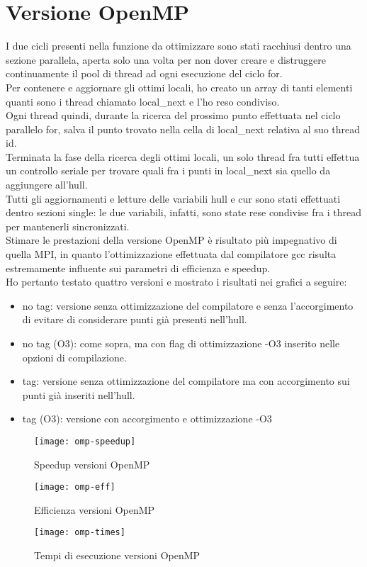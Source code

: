 \documentclass[a4paper, 12pt]{article}
\begin{document}
    \section*{Versione OpenMP}
    I due cicli presenti nella funzione da ottimizzare sono stati racchiusi dentro una sezione parallela, aperta solo una volta per non dover creare e distruggere 
    continuamente il pool di thread ad ogni esecuzione del ciclo for. \\
    Per contenere e aggiornare gli ottimi locali, ho creato un array di tanti elementi quanti sono i thread chiamato local_next e l’ho reso condiviso. \\
    Ogni thread quindi, durante la ricerca del prossimo punto effettuata nel ciclo parallelo for, salva il punto trovato nella cella di local_next relativa al suo thread id. \\
    Terminata la fase della ricerca degli ottimi locali, un solo thread fra tutti effettua un controllo seriale per trovare quali fra i punti in local_next sia quello da aggiungere all’hull. \\
    Tutti gli aggiornamenti e letture delle variabili hull e cur sono stati effettuati dentro sezioni single: le due variabili, infatti, sono state rese condivise fra i thread per mantenerli sincronizzati.\\

    Stimare le prestazioni della versione OpenMP è risultato più impegnativo di quella MPI, in quanto l'ottimizzazione effettuata dal compilatore gcc risulta estremamente influente sui parametri di efficienza e speedup.\\
    Ho pertanto testato quattro versioni e mostrato i risultati nei grafici a seguire:
    \begin{itemize}
        \item no tag: versione senza ottimizzazione del compilatore e senza l'accorgimento di evitare di considerare punti già presenti nell'hull.
        \item no tag (O3): come sopra, ma con flag di ottimizzazione -O3 inserito nelle opzioni di compilazione.
        \item tag: versione senza ottimizzazione del compilatore ma con accorgimento sui punti già inseriti nell'hull.
        \item tag (O3): versione con accorgimento e ottimizzazione -O3
    \end{itemize}

    \begin{figure}[H]
        \caption{Speedup versioni OpenMP}
        \texttt{[image: omp-speedup]}
    \end{figure}
    \begin{figure}[H]
        \caption{Efficienza versioni OpenMP}
        \texttt{[image: omp-eff]}
    \end{figure}
    \begin{figure}[H]
        \caption{Tempi di esecuzione versioni OpenMP}
        \texttt{[image: omp-times]}
    \end{figure}
\end{document}
